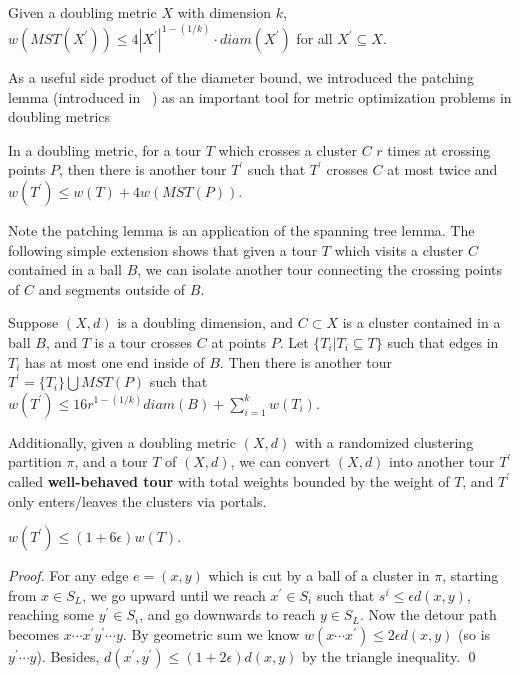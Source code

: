 \documentclass{llncs}
\begin{document}
\begin{lemma}
Given a doubling metric $X$ with dimension $k$, $w(MST(X^\prime))\leq 4|X^\prime|^{1-(1/k)}\cdot diam(X^\prime)$ for all $X^\prime\subseteq X$.
\end{lemma}

As a useful side product of the diameter bound, we introduced the patching lemma 
(introduced in ~\cite{Arora98}) as an important tool for metric optimization problems in doubling metrics~\cite{Talwar04} 

\begin{corollary}
In a doubling metric, for a tour $T$ which crosses a cluster $C$ $r$ times at crossing points $P$, then there is another tour $T^\prime$ such that $T^\prime$ crosses $C$ at most twice and $w(T^\prime)\leq w(T)+4w(MST(P))$.
\end{corollary}

Note the patching lemma is an application of the spanning tree lemma. 
The following simple extension shows that given a tour $T$ which visits a cluster $C$ contained in a ball $B$, we can isolate another tour connecting the crossing points of $C$ and segments outside of $B$.

\begin{corollary}
Suppose $(X,d)$ is a doubling dimension, and $C\subset X$ is a cluster contained in a ball $B$, and $T$ is a tour crosses $C$ at points $P$.
Let $\{T_i|T_i\subseteq T\}$ such that edges in $T_i$ has at most one end inside of $B$.
Then there is another tour $T^\prime=\{T_i\}\bigcup MST(P)$ such that $w(T^\prime)\leq 16r^{1-(1/k)}diam(B)+\sum_{i=1}^k w(T_i)$.
\end{corollary}

Additionally, given a doubling metric $(X,d)$ with a randomized clustering partition $\pi$, and a tour $T$ of $(X,d)$, we can convert $(X,d)$ into another tour $T^\prime$ called \textbf{well-behaved tour} with total weights bounded by the weight of $T$, and $T^\prime$ only enters/leaves the clusters via portals.

\begin{lemma}
$w(T^\prime)\leq (1+6\epsilon)w(T)$.
\end{lemma}

\begin{proof}
For any edge $e=(x,y)$ which is cut by a ball of a cluster in $\pi$, starting from $x\in S_L$, we go upward until we reach $x^\prime\in S_i$ such that $s^i\leq\epsilon d(x,y)$, reaching some $y^\prime\in S_i$, and go downwards to reach $y\in S_L$.
Now the detour path becomes $x\cdots x^\prime y^\prime\cdots y$.
By geometric sum we know $w(x\cdots x^\prime)\leq 2\epsilon d(x,y)$ (so is $y^\prime\cdots y$).
Besides, $d(x^\prime, y^\prime)\leq(1+2\epsilon)d(x,y)$ by the triangle inequality.
\qed
\end{proof}
\end{document}
